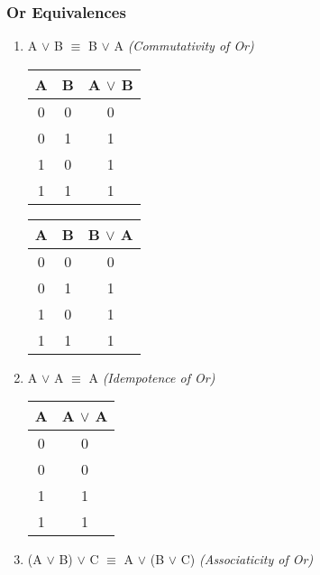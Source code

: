 \documentclass[11pt]{article}
\begin{document}
\subsubsection{Or Equivalences}
\begin{enumerate}

  \item A $\lor$ B $\equiv$ B $\lor$ A \emph{(Commutativity of Or)}

\begin{tabular}{| c | c | c |}
  \hline
  A & B & A $\lor$ B \\ \hline
  0 & 0 & 0 \\
  0 & 1 & 1 \\
  1 & 0 & 1 \\
  1 & 1 & 1 \\ \hline
\end{tabular}
\quad
\begin{tabular}{| c | c | c |}
  \hline
  A & B & B $\lor$ A \\ \hline
  0 & 0 & 0 \\
  0 & 1 & 1 \\
  1 & 0 & 1 \\
  1 & 1 & 1 \\ \hline
\end{tabular}

\item A $\lor$ A $\equiv$ A \emph{(Idempotence of Or)}

\begin{tabular}{| c | c |}
  \hline
  A & A $\lor$ A \\ \hline
  0 & 0 \\
  0 & 0 \\
  1 & 1 \\
  1 & 1 \\ \hline
\end{tabular}

  \item (A $\lor$ B) $\lor$ C $\equiv$ A $\lor$ (B $\lor$ C) \emph{(Associaticity of Or)}


\end{enumerate}
\end{document}

